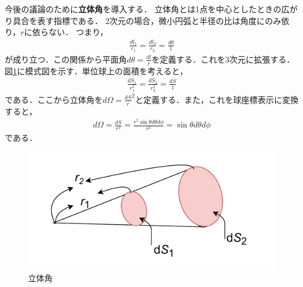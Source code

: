 \documentclass{report}
\begin{document}
  今後の議論のために\textbf{立体角}を導入する．
  立体角とは1点を中心としたときの広がり具合を表す指標である．
  2次元の場合，微小円弧と半径の比は角度にのみ依り，$r$に依らない．
  つまり，
  \begin{align}
    \frac{dl_1}{r_1}=\frac{dl_2}{r_2}=\frac{d\theta}{1}
  \end{align}
  が成り立つ．この関係から平面角$d\theta=\frac{dl}{r}$を定義する．これを3次元に拡張する．図\ref{solid_angle}に模式図を示す．単位球上の面積を考えると，
  \begin{align}
    \frac{dS_1}{r_1^2}=\frac{dS_2}{r_2^2}=\frac{dS}{1}
  \end{align}
  である．ここから立体角を$d\Omega=\frac{dS}r^2$と定義する．また，これを球座標表示に変換すると，
  \begin{align}
    d\Omega = \frac{dS}{r^2} = \frac{r^2\sin\theta d\theta d\phi}{r^2} = \sin \theta d\theta d\phi
  \end{align}
  である．

  \begin{figure}[htbp]
    \centering
    \includegraphics[width=0.6\columnwidth]{fig/solid_angle.pdf}
    \caption{立体角}
    \label{solid_angle}
  \end{figure}
\end{document}
